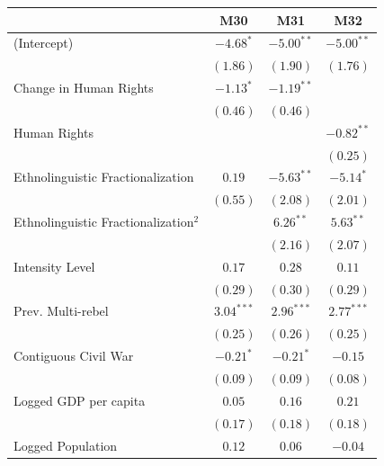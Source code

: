 \documentclass[12pt,]{book}
\let\origtable\table
\let\endorigtable\endtable
\renewenvironment{table}[1][2] {
    \singlespacing
    \expandafter\origtable\expandafter[H]
} {
    \endorigtable
}
\theoremstyle{definition}
\theoremstyle{definition}
\theoremstyle{definition}
\theoremstyle{remark}
\begin{document}
\begin{table}
\begin{center}
\begin{tabular}{l c c c }
\hline
 & M30 & M31 & M32 \\
\hline
(Intercept)                             & $-4.68^{*}$  & $-5.00^{**}$ & $-5.00^{**}$ \\
                                        & $(1.86)$     & $(1.90)$     & $(1.76)$     \\
Change in Human Rights                  & $-1.13^{*}$  & $-1.19^{**}$ &              \\
                                        & $(0.46)$     & $(0.46)$     &              \\
Human Rights                            &              &              & $-0.82^{**}$ \\
                                        &              &              & $(0.25)$     \\
Ethnolinguistic Fractionalization       & $0.19$       & $-5.63^{**}$ & $-5.14^{*}$  \\
                                        & $(0.55)$     & $(2.08)$     & $(2.01)$     \\
Ethnolinguistic Fractionalization$^{2}$ &              & $6.26^{**}$  & $5.63^{**}$  \\
                                        &              & $(2.16)$     & $(2.07)$     \\
Intensity Level                         & $0.17$       & $0.28$       & $0.11$       \\
                                        & $(0.29)$     & $(0.30)$     & $(0.29)$     \\
Prev. Multi-rebel                       & $3.04^{***}$ & $2.96^{***}$ & $2.77^{***}$ \\
                                        & $(0.25)$     & $(0.26)$     & $(0.25)$     \\
Contiguous Civil War                    & $-0.21^{*}$  & $-0.21^{*}$  & $-0.15$      \\
                                        & $(0.09)$     & $(0.09)$     & $(0.08)$     \\
Logged GDP per capita                   & $0.05$       & $0.16$       & $0.21$       \\
                                        & $(0.17)$     & $(0.18)$     & $(0.18)$     \\
Logged Population                       & $0.12$       & $0.06$       & $-0.04$      \\

\end{tabular}
\end{center}
\end{table}
\end{document}
